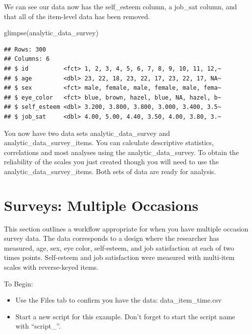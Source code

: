 \documentclass[
]{krantz}
\makeatletter
\newenvironment{Shaded}{\begin{snugshade}}{\end{snugshade}}
\newcommand{\FunctionTok}[1]{\textcolor[rgb]{0,0,0}{#1}}
\newcommand{\NormalTok}[1]{#1}
\newenvironment{kframe}{%
\medskip{}
\setlength{\fboxsep}{.8em}
 \def\at@end@of@kframe{}%
 \ifinner\ifhmode%
  \def\at@end@of@kframe{\end{minipage}}%
  \begin{minipage}{\columnwidth}%
 \fi\fi%
 \def\FrameCommand##1{\hskip\@totalleftmargin \hskip-\fboxsep
 \colorbox{shadecolor}{##1}\hskip-\fboxsep
     \hskip-\linewidth \hskip-\@totalleftmargin \hskip\columnwidth}%
 \MakeFramed {\advance\hsize-\width
   \@totalleftmargin\z@ \linewidth\hsize
   \@setminipage}}%
 {\par\unskip\endMakeFramed%
 \at@end@of@kframe}
\renewenvironment{Shaded}{\begin{kframe}}{\end{kframe}}
\makeatother
\begin{document}
We can see our data now has the self\_esteem column, a job\_sat column, and that all of the item-level data has been removed.

\begin{Shaded}
\begin{Highlighting}[]
\FunctionTok{glimpse}\NormalTok{(analytic\_data\_survey)}
\end{Highlighting}
\end{Shaded}

\begin{verbatim}
## Rows: 300
## Columns: 6
## $ id          <fct> 1, 2, 3, 4, 5, 6, 7, 8, 9, 10, 11, 12,~
## $ age         <dbl> 23, 22, 18, 23, 22, 17, 23, 22, 17, NA~
## $ sex         <fct> male, female, male, female, male, fema~
## $ eye_color   <fct> blue, brown, hazel, blue, NA, hazel, b~
## $ self_esteem <dbl> 3.200, 3.800, 3.800, 3.000, 3.400, 3.5~
## $ job_sat     <dbl> 4.00, 5.00, 4.40, 3.50, 4.00, 3.80, 3.~
\end{verbatim}

You now have two data sets analytic\_data\_survey and analytic\_data\_survey\_items. You can calculate descriptive statistics, correlations and most analyses using the analytic\_data\_survey. To obtain the reliability of the scales you just created though you will need to use the analytic\_data\_survey\_items. Both sets of data are ready for analysis.

\hypertarget{surveys-multiple-occasions}{%
\section{Surveys: Multiple Occasions}\label{surveys-multiple-occasions}}

This section outlines a workflow appropriate for when you have multiple occasion survey data. The data corresponds to a design where the researcher has measured, age, sex, eye color, self-esteem, and job satisfaction at each of two times points. Self-esteem and job satisfaction were measured with multi-item scales with reverse-keyed items.

To Begin:

\begin{itemize}
\item
  Use the Files tab to confirm you have the data: data\_item\_time.csv
\item
  Start a new script for this example. Don't forget to start the script name with ``script\_''.
\end{itemize}
\end{document}
